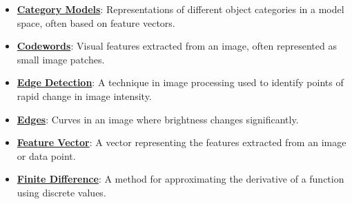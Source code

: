 \documentclass{article}%
\begin{document}
\begin{itemize}[leftmargin=*]%
\item \href{https://purdue.brightspace.com/d2l/common/assets/pdfjs-d2l-dist/1.0.14-legacy/web/viewer.html?file=%2Fcontent%2Fenforced%2F1095467-wl.202510.CS.24300.001%2F08L2-Feature Extraction.pdf%3Fou%3D1095467&lang=en-us&container=d2l-fileviewer-rendered-pdf&fullscreen=d2l-fileviewer-rendered-pdf-dialog&height=667#page=3}{\textbf{Category Models}}: Representations of different object categories in a model space, often based on feature vectors.%
\item \href{https://purdue.brightspace.com/d2l/common/assets/pdfjs-d2l-dist/1.0.14-legacy/web/viewer.html?file=%2Fcontent%2Fenforced%2F1095467-wl.202510.CS.24300.001%2F08L2-Feature Extraction.pdf%3Fou%3D1095467&lang=en-us&container=d2l-fileviewer-rendered-pdf&fullscreen=d2l-fileviewer-rendered-pdf-dialog&height=667#page=2}{\textbf{Codewords}}: Visual features extracted from an image, often represented as small image patches.%
\item \href{https://purdue.brightspace.com/d2l/common/assets/pdfjs-d2l-dist/1.0.14-legacy/web/viewer.html?file=%2Fcontent%2Fenforced%2F1095467-wl.202510.CS.24300.001%2F08L2-Feature Extraction.pdf%3Fou%3D1095467&lang=en-us&container=d2l-fileviewer-rendered-pdf&fullscreen=d2l-fileviewer-rendered-pdf-dialog&height=667#page=4}{\textbf{Edge Detection}}: A technique in image processing used to identify points of rapid change in image intensity.%
\item \href{https://purdue.brightspace.com/d2l/common/assets/pdfjs-d2l-dist/1.0.14-legacy/web/viewer.html?file=%2Fcontent%2Fenforced%2F1095467-wl.202510.CS.24300.001%2F08L2-Feature Extraction.pdf%3Fou%3D1095467&lang=en-us&container=d2l-fileviewer-rendered-pdf&fullscreen=d2l-fileviewer-rendered-pdf-dialog&height=667#page=8}{\textbf{Edges}}: Curves in an image where brightness changes significantly.%
\item \href{https://purdue.brightspace.com/d2l/common/assets/pdfjs-d2l-dist/1.0.14-legacy/web/viewer.html?file=%2Fcontent%2Fenforced%2F1095467-wl.202510.CS.24300.001%2F08L2-Feature Extraction.pdf%3Fou%3D1095467&lang=en-us&container=d2l-fileviewer-rendered-pdf&fullscreen=d2l-fileviewer-rendered-pdf-dialog&height=667#page=3}{\textbf{Feature Vector}}: A vector representing the features extracted from an image or data point.%
\item \href{https://purdue.brightspace.com/d2l/common/assets/pdfjs-d2l-dist/1.0.14-legacy/web/viewer.html?file=%2Fcontent%2Fenforced%2F1095467-wl.202510.CS.24300.001%2F08L2-Feature Extraction.pdf%3Fou%3D1095467&lang=en-us&container=d2l-fileviewer-rendered-pdf&fullscreen=d2l-fileviewer-rendered-pdf-dialog&height=667#page=15}{\textbf{Finite Difference}}: A method for approximating the derivative of a function using discrete values.%

\end{itemize}
\end{document}
